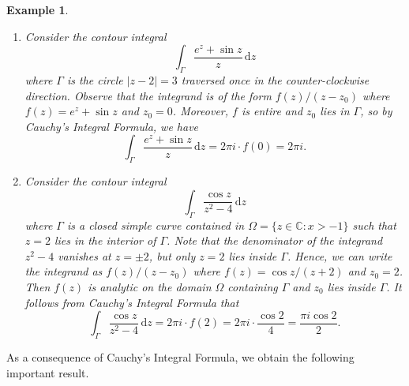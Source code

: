 \documentclass[10pt]{article}
\newcommand{\C}{\mathbb{C}}
\newcommand{\dd}{\,\mathrm{d}}
\theoremstyle{newstyle}
\newtheorem{exmp}[thm]{Example}
\begin{document}
\begin{exmp}~
\begin{enumerate}[(1)]
    \item Consider the contour integral 
    \[ \int_\Gamma \frac{e^z + \sin z}z \dd z \]
    where $\Gamma$ is the circle $|z - 2| = 3$ traversed once in the counter-clockwise direction. 
    Observe that the integrand is of the form $f(z)/(z-z_0)$ where 
    $f(z) = e^z + \sin z$ and $z_0 = 0$. Moreover, $f$ is entire and $z_0$ lies in 
    $\Gamma$, so by Cauchy's Integral Formula, we have 
    \[ \int_\Gamma \frac{e^z + \sin z}z \dd z = 2\pi i \cdot f(0) = 2\pi i. \]
    \item Consider the contour integral 
    \[ \int_\Gamma \frac{\cos z}{z^2 - 4} \dd z \]
    where $\Gamma$ is a closed simple curve contained in $\Omega = \{z \in \C : x > -1\}$ 
    such that $z = 2$ lies in the interior of $\Gamma$. Note that the denominator of 
    the integrand $z^2 - 4$ vanishes at $z = \pm2$, but only $z = 2$ lies inside $\Gamma$. 
    Hence, we can write the integrand as $f(z)/(z-z_0)$ where 
    $f(z) = \cos z / (z+2)$ and $z_0 = 2$. Then $f(z)$ is analytic on the domain 
    $\Omega$ containing $\Gamma$ and $z_0$ lies inside $\Gamma$. It follows from 
    Cauchy's Integral Formula that 
    \[ \int_\Gamma \frac{\cos z}{z^2 - 4}\dd z = 2\pi i \cdot f(2) = 2\pi i \cdot 
    \frac{\cos 2}4 = \frac{\pi i \cos 2}2. \]
\end{enumerate}
\end{exmp}

As a consequence of Cauchy's Integral Formula, we obtain the following important result.
\end{document}
